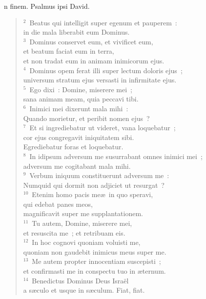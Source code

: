 \bchapter
{}n finem. Psalmus ipsi David.
\begin{flushleft}\begin{verse}\vspace{6pt}${}^{2}$~Beatus qui intelligit super egenum et pauperem~:\\ in die mala liberabit eum Dominus.\\
${}^{3}$~Dominus conservet eum, et vivificet eum,\\ et beatum faciat eum in terra,\\ et non tradat eum in animam inimicorum ejus.\\
${}^{4}$~Dominus opem ferat illi super lectum doloris ejus~;\\ universum stratum ejus versasti in infirmitate ejus.\\
${}^{5}$~Ego dixi~: Domine, miserere mei~;\\ sana animam meam, quia peccavi tibi.\\
${}^{6}$~Inimici mei dixerunt mala mihi~:\\ Quando morietur, et peribit nomen ejus~?\\
${}^{7}$~Et si ingrediebatur ut videret, vana loquebatur~;\\ cor ejus congregavit iniquitatem sibi.\\ Egrediebatur foras et loquebatur.\\
${}^{8}$~In idipsum adversum me susurrabant omnes inimici mei~;\\ adversum me cogitabant mala mihi.\\
${}^{9}$~Verbum iniquum constituerunt adversum me~:\\ Numquid qui dormit non adjiciet ut resurgat~?\\
${}^{10}$~Etenim homo pacis me\ae\ in quo speravi,\\ qui edebat panes meos,\\ magnificavit super me supplantationem.\\
${}^{11}$~Tu autem, Domine, miserere mei,\\ et resuscita me~; et retribuam eis.\\
${}^{12}$~In hoc cognovi quoniam voluisti me,\\ quoniam non gaudebit inimicus meus super me.\\
${}^{13}$~Me autem propter innocentiam suscepisti~;\\ et confirmasti me in conspectu tuo in \ae ternum.\\
${}^{14}$~Benedictus Dominus Deus Isra\"el\\ a s\ae culo et usque in s\ae culum. Fiat, fiat.\end{verse}\end{flushleft}



